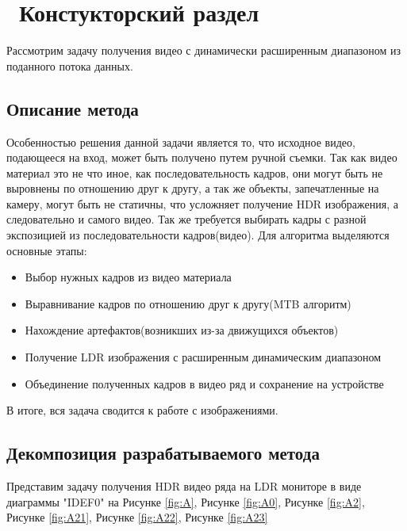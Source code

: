 \chapter{ Констукторский раздел}
\label{cha:design}

Рассмотрим задачу получения видео с динамически расширенным диапазоном из поданного потока данных. 

\section{ Описание метода}

    Особенностью решения данной задачи является то, что исходное видео, подающееся на вход, может быть получено путем ручной съемки. Так как видео материал это не что иное, как последовательность кадров, они могут быть не выровнены по отношению друг к другу, а так же объекты, запечатленные на камеру, могут быть не статичны, что усложняет получение HDR изображения, а следовательно и самого видео. Так же требуется выбирать кадры с разной экспозицией из последовательности кадров(видео). Для алгоритма выделяются основные этапы:

\begin{itemize}
    \item Выбор нужных кадров из видео материала
    \item Выравнивание кадров по отношению друг к другу(MTB алгоритм)
    \item Нахождение артефактов(возникших из-за движущихся объектов)
    \item Получение LDR изображения с расширенным динамическим диапазоном
    \item Объединение полученных кадров в видео ряд и сохранение на устройстве
\end{itemize}

В итоге, вся задача сводится к работе с изображениями.

\section{ Декомпозиция разрабатываемого метода}

Представим задачу получения HDR видео ряда на LDR мониторе в виде диаграммы "IDEF0" на Рисунке \ref{fig:A}, Рисунке \ref{fig:A0}, Рисунке \ref{fig:A2}, Рисунке \ref{fig:A21}, Рисунке \ref{fig:A22}, Рисунке \ref{fig:A23}


